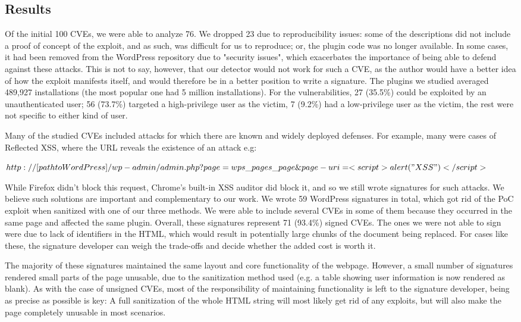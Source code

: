 \subsection{Results}

Of the initial 100 CVEs, we were able to analyze 76. We dropped 23 due to reproducibility issues: some of the descriptions did not include a proof of concept of the exploit, and as such, was difficult for us to reproduce; or, the plugin code was no longer available. In some cases, it had been removed from the WordPress repository due to "security issues", which exacerbates the importance of being able to defend against these attacks. This is not to say, however, that our detector would not work for such a CVE, as the author would have a better idea of how the exploit manifests itself, and would therefore be in a better position to write a signature. The plugins we studied averaged 489,927 installations (the most popular one had 5 million installations). For the vulnerabilities, 27 (35.5\%) could be exploited by an unauthenticated user; 56 (73.7\%) targeted a high-privilege user as the victim, 7 (9.2\%) had a low-privilege user as the victim, the rest were not specific to either kind of user.

Many of the studied CVEs included attacks for which there are known and widely deployed defenses. For example, many were cases of Reflected XSS, where the URL reveals the existence of an attack e.g:


$http://[path to WordPress]/wp-admin/admin.php?page=wps\_pages\_page\&page-uri=<script>alert("XSS")</script>$

While Firefox didn't block this request, Chrome's built-in XSS auditor did block it, and so we still wrote signatures for such attacks. We believe such solutions are important and complementary to our work. We wrote 59 WordPress signatures in total, which got rid of the PoC exploit when sanitized with one of our three methods. We were able to include several CVEs in some of them because they occurred in the same page and affected the same plugin. Overall, these signatures represent 71 (93.4\%) signed CVEs. The ones we were not able to sign were due to lack of identifiers in the HTML, which would result in potentially large chunks of the document being replaced. For cases like these, the signature developer can weigh the trade-offs and decide whether the added cost is worth it.

The majority of these signatures maintained the same layout and core functionality of the webpage. However, a small number of signatures rendered small parts of the page unusable, due to the sanitization method used (e.g. a table showing user information is now rendered as blank). As with the case of unsigned CVEs, most of the responsibility of maintaining functionality is left to the signature developer, being as precise as possible is key: A full sanitization of the whole HTML string will most likely get rid of any exploits, but will also make the page completely unusable in most scenarios.


